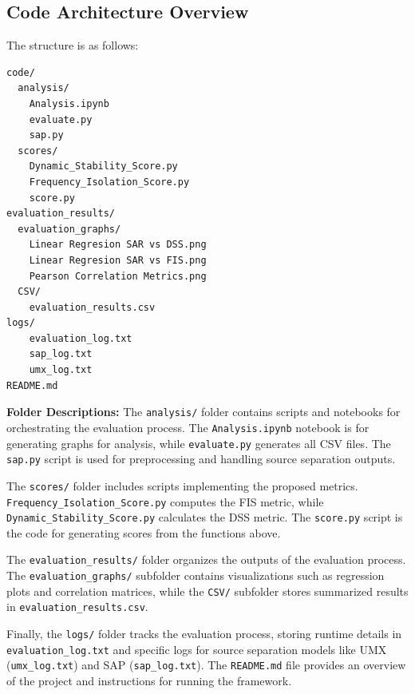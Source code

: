 \documentclass[10pt,twocolumn]{article}
\begin{document}
\subsection{Code Architecture Overview}

 The structure is as follows:

\begin{verbatim}
code/
  analysis/
    Analysis.ipynb
    evaluate.py 
    sap.py
  scores/
    Dynamic_Stability_Score.py           
    Frequency_Isolation_Score.py
    score.py
evaluation_results/
  evaluation_graphs/
    Linear Regresion SAR vs DSS.png 
    Linear Regresion SAR vs FIS.png 
    Pearson Correlation Metrics.png
  CSV/
    evaluation_results.csv
logs/
    evaluation_log.txt
    sap_log.txt
    umx_log.txt
README.md
\end{verbatim}

\textbf{Folder Descriptions:}
The \texttt{analysis/} folder contains scripts and notebooks for orchestrating the evaluation process. The \texttt{Analysis.ipynb} notebook is for generating graphs for analysis, while \texttt{evaluate.py} generates all CSV files. The \texttt{sap.py} script is used for preprocessing and handling source separation outputs.

The \texttt{scores/} folder includes scripts implementing the proposed metrics. \texttt{Frequency\_Isolation\_Score.py} computes the FIS metric, while \texttt{Dynamic\_Stability\_Score.py} calculates the DSS metric. The \texttt{score.py} script is the code for generating scores from the functions above.

The \texttt{evaluation\_results/} folder organizes the outputs of the evaluation process. The \texttt{evaluation\_graphs/} subfolder contains visualizations such as regression plots and correlation matrices, while the \texttt{CSV/} subfolder stores summarized results in \texttt{evaluation\_results.csv}.

Finally, the \texttt{logs/} folder tracks the evaluation process, storing runtime details in \texttt{evaluation\_log.txt} and specific logs for source separation models like UMX (\texttt{umx\_log.txt}) and SAP (\texttt{sap\_log.txt}). The \texttt{README.md} file provides an overview of the project and instructions for running the framework.


\printbibliography
\end{document}
